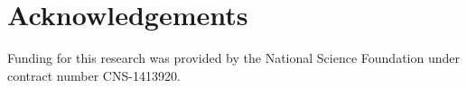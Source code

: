 \section{Acknowledgements}

Funding for this research was provided by the National Science Foundation under
contract number \mbox{CNS-1413920}.
